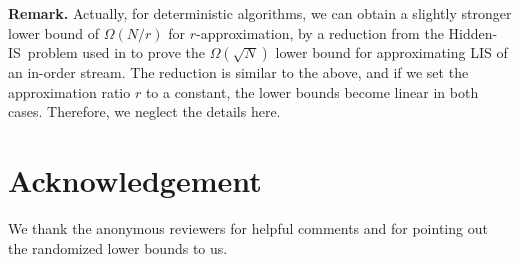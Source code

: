 \documentclass{llncs}
\newcommand{\runtitle}[1]{{\small \textbf{\boldmath #1}}}
\newcommand{\hlis}{{\sc Hidden-IS}}
\begin{document}
\runtitle{Remark.} Actually, for deterministic algorithms, we can obtain a
slightly stronger lower bound of $\Omega(N/r)$ for $r$-approximation, by
a reduction from the \hlis~problem used in \cite{GaG07} to prove the
$\Omega(\sqrt{N})$ lower bound for approximating LIS of an in-order stream.  The
reduction is similar to the above, and if we set the approximation ratio
$r$ to a constant, the lower bounds become linear in both cases.  Therefore, we
neglect the details here.



\section*{Acknowledgement}
We thank the anonymous reviewers for helpful comments and for pointing out the
randomized lower bounds to us.
\end{document}
